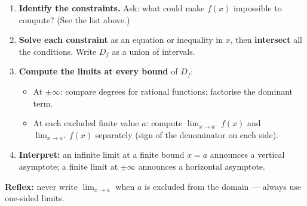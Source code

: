 \documentclass[11pt]{article}
\newcommand{\cle}[1]{{\popxbold\color{popdark}#1}}
\begin{document}
\begin{methode}
\begin{enumerate}
\item \textbf{Identify the constraints.} Ask: what could make $f(x)$ impossible to compute? (See the list above.)
\item \textbf{Solve each constraint} as an equation or inequality in $x$, then \textbf{intersect} all the conditions. Write $D_f$ as a union of intervals.
\item \textbf{Compute the limits at every bound} of $D_f$:
\begin{itemize}
\item At $\pm\infty$: compare degrees for rational functions; factorise the dominant term.
\item At each excluded finite value $a$: compute $\lim_{x\to a^-} f(x)$ and $\lim_{x\to a^+} f(x)$ separately (sign of the denominator on each side).
\end{itemize}
\item \textbf{Interpret:} an infinite limit at a finite bound $x=a$ announces a \cle{vertical asymptote}; a finite limit at $\pm\infty$ announces a \cle{horizontal asymptote}.
\end{enumerate}
\textbf{Reflex:} never write $\lim_{x\to a}$ when $a$ is excluded from the domain — always use one-sided limits.
\end{methode}
\end{document}
